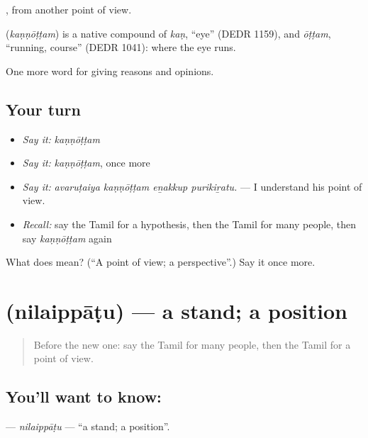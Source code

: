  , from another point of view.

\begin{cousinweb}
\textbf{} (\emph{kaṇṇōṭṭam}) is a native compound of \emph{kaṇ}, \textquotedblleft{}eye\textquotedblright{} (DEDR 1159), and \emph{ōṭṭam}, \textquotedblleft{}running, course\textquotedblright{} (DEDR 1041): where the eye runs.
\end{cousinweb}

\begin{grammarlens}[title={What you've built}]
One more word for giving reasons and opinions.
\end{grammarlens}

\subsection*{Your turn}
\begin{itemize}
\raggedright
  \item \emph{Say it:} \emph{kaṇṇōṭṭam}
  \item \emph{Say it:} \emph{kaṇṇōṭṭam}, once more
  \item \emph{Say it:} \emph{avaruṭaiya kaṇṇōṭṭam eṉakkup purikiṟatu.} — I understand his point of view.
  \item \emph{Recall:} say the Tamil for a hypothesis, then the Tamil for many people, then say \emph{kaṇṇōṭṭam} again
\end{itemize}

\begin{tcolorbox}[breakable,colback=teal!4,colframe=teal!35!black,title={Before you move on}]
What does  mean? (\textquotedblleft{}A point of view; a perspective\textquotedblright{}.) Say it once more.
\end{tcolorbox}
\section[\texorpdfstring{\ta{நிலைப்பாடு} (nilaippāṭu)}{நிலைப்பாடு (nilaippāṭu)}]{ (nilaippāṭu) — a stand; a position}

\label{lesson:TA-C350-nilaippatu}



\begin{quote}
Before the new one: say the Tamil for many people, then the Tamil for a point of view.
\end{quote}

\subsection*{You'll want to know: }
\textbf{} — \emph{nilaippāṭu} — \textquotedblleft{}a stand; a position\textquotedblright{}.

